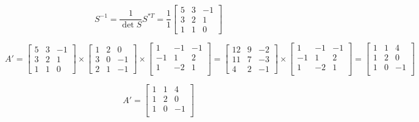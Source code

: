 $$
  S^{-1} = \dfrac{1}{\det{S}} S^{*T} = \dfrac{1}{1}
    \begin{bmatrix}
      5 & 3 & -1 \\
      3 & 2 & 1 \\
      1 & 1 & 0
    \end{bmatrix}
$$

$$
A'= \begin{bmatrix}
  5 & 3 & -1 \\
  3 & 2 & 1 \\
  1 & 1 & 0
\end{bmatrix} \times \begin{bmatrix}
  1 & 2 & 0 \\
  3 & 0 & -1 \\
  2 & 1 & -1
\end{bmatrix} \times \begin{bmatrix}
  1& -1& -1 \\
 -1&  1&  2 \\
  1& -2&  1 \\
  \end{bmatrix} = \begin{bmatrix}
    12 & 9 & -2 \\
    11 & 7 & -3 \\
    4 & 2 & -1
  \end{bmatrix} \times \begin{bmatrix}
    1& -1& -1 \\
   -1&  1&  2 \\
    1& -2&  1 \\
  \end{bmatrix} = \begin{bmatrix}
      1& 1& 4 \\
      1& 2& 0 \\
      1& 0&-1 \\
    \end{bmatrix}
$$

$$
\boxed{
  A' = \begin{bmatrix}
    1& 1& 4 \\
    1& 2& 0 \\
    1& 0&-1 \\
  \end{bmatrix}
}
$$
